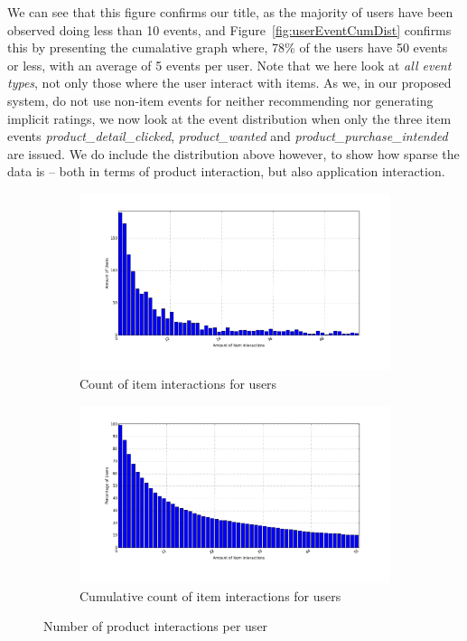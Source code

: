 We can see that this figure confirms our title, as the majority of users have
been observed doing less than 10 events, and Figure~\ref{fig:userEventCumDist}
confirms this by presenting the cumalative graph where, 78\% of the users have
50 events or less, with an average of 5 events per user. Note that we here look
at \textit{all event types}, not only those where the user interact with items.
As we, in our proposed system, do not use non-item events for neither
recommending nor generating implicit ratings, we now look at the event
distribution when only the three item events \textit{product\_detail\_clicked},
\textit{product\_wanted} and \textit{product\_purchase\_intended} are issued.
We do include the distribution above however, to show how sparse the data is --
both in terms of product interaction, but also application interaction.

\begin{figure}[H]
    \centering
    \begin{subfigure}{.5\textwidth}
        \includegraphics[width=\dualGraphWidth]{image/ratingsPerUserdistribution.png}
        \centering
        \caption{Count of item interactions for users}
        \label{fig:ratingsPerUser}
    \end{subfigure}%
    \begin{subfigure}{.5\textwidth}
        \includegraphics[width=\dualGraphWidth]{image/ratingsPerUsercumdistribution.png}
        \centering
        \caption{Cumulative count of item interactions for users}
        \label{fig:ratingsPerUserCum}
    \end{subfigure}
    \caption{Number of product interactions per user}
\end{figure}

